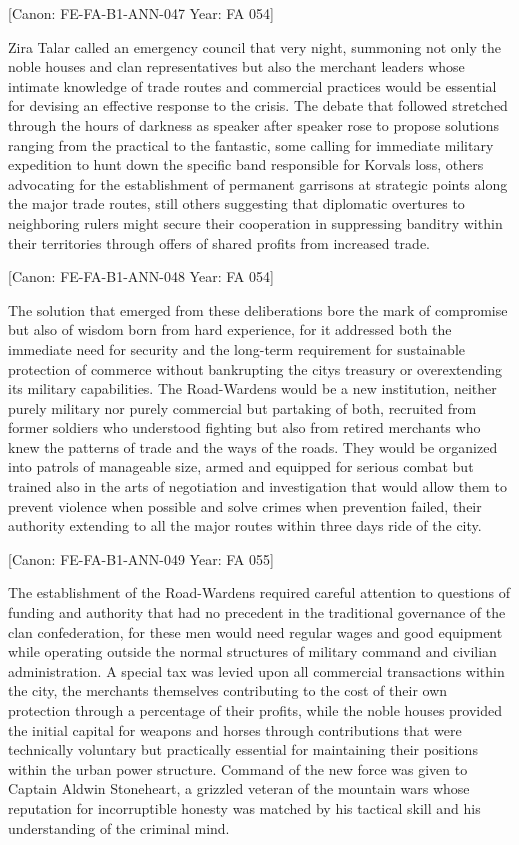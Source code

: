 {[}Canon: FE-FA-B1-ANN-047 \textbar{} Year: FA 054{]}

Zira Talar called an emergency council that very night, summoning not
only the noble houses and clan representatives but also the merchant
leaders whose intimate knowledge of trade routes and commercial
practices would be essential for devising an effective response to the
crisis. The debate that followed stretched through the hours of darkness
as speaker after speaker rose to propose solutions ranging from the
practical to the fantastic, some calling for immediate military
expedition to hunt down the specific band responsible for
Korval\textquotesingle s loss, others advocating for the establishment
of permanent garrisons at strategic points along the major trade routes,
still others suggesting that diplomatic overtures to neighboring rulers
might secure their cooperation in suppressing banditry within their
territories through offers of shared profits from increased trade.

{[}Canon: FE-FA-B1-ANN-048 \textbar{} Year: FA 054{]}

The solution that emerged from these deliberations bore the mark of
compromise but also of wisdom born from hard experience, for it
addressed both the immediate need for security and the long-term
requirement for sustainable protection of commerce without bankrupting
the city\textquotesingle s treasury or overextending its military
capabilities. The Road-Wardens would be a new institution, neither
purely military nor purely commercial but partaking of both, recruited
from former soldiers who understood fighting but also from retired
merchants who knew the patterns of trade and the ways of the roads. They
would be organized into patrols of manageable size, armed and equipped
for serious combat but trained also in the arts of negotiation and
investigation that would allow them to prevent violence when possible
and solve crimes when prevention failed, their authority extending to
all the major routes within three days\textquotesingle{} ride of the
city.

{[}Canon: FE-FA-B1-ANN-049 \textbar{} Year: FA 055{]}

The establishment of the Road-Wardens required careful attention to
questions of funding and authority that had no precedent in the
traditional governance of the clan confederation, for these men would
need regular wages and good equipment while operating outside the normal
structures of military command and civilian administration. A special
tax was levied upon all commercial transactions within the city, the
merchants themselves contributing to the cost of their own protection
through a percentage of their profits, while the noble houses provided
the initial capital for weapons and horses through contributions that
were technically voluntary but practically essential for maintaining
their positions within the urban power structure. Command of the new
force was given to Captain Aldwin Stoneheart, a grizzled veteran of the
mountain wars whose reputation for incorruptible honesty was matched by
his tactical skill and his understanding of the criminal mind.

